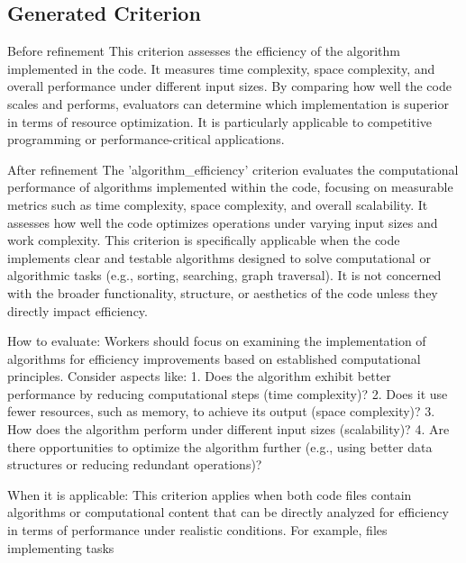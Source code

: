 \subsection{Generated Criterion}
\begin{tcolorbox}
    [title = {Criterion \textbf{algorithm\_efficiency}},breakable] Before refinement
    \tcblower \footnotesize This criterion assesses the efficiency of the algorithm
    implemented in the code. It measures time complexity, space complexity, and
    overall performance under different input sizes. By comparing how well the code
    scales and performs, evaluators can determine which implementation is
    superior in terms of resource optimization. It is particularly applicable to
    competitive programming or performance-critical applications.
\end{tcolorbox}
\begin{tcolorbox}
    [title = {Criterion \textbf{algorithm\_efficiency}},breakable] After refinement
    \tcblower \footnotesize The 'algorithm\_efficiency' criterion evaluates the computational
    performance of algorithms implemented within the code, focusing on
    measurable metrics such as time complexity, space complexity, and overall
    scalability. It assesses how well the code optimizes operations under varying
    input sizes and work complexity. This criterion is specifically applicable
    when the code implements clear and testable algorithms designed to solve
    computational or algorithmic tasks (e.g., sorting, searching, graph traversal).
    It is not concerned with the broader functionality, structure, or aesthetics
    of the code unless they directly impact efficiency. \par How to evaluate: Workers
    should focus on examining the implementation of algorithms for efficiency improvements
    based on established computational principles. Consider aspects like: 1. Does
    the algorithm exhibit better performance by reducing computational steps (time
    complexity)? 2. Does it use fewer resources, such as memory, to achieve its
    output (space complexity)? 3. How does the algorithm perform under different
    input sizes (scalability)? 4. Are there opportunities to optimize the
    algorithm further (e.g., using better data structures or reducing redundant operations)?\par
    When it is applicable: This criterion applies when both code files contain algorithms
    or computational content that can be directly analyzed for efficiency in terms
    of performance under realistic conditions. For example, files implementing tasks

\end{tcolorbox}
